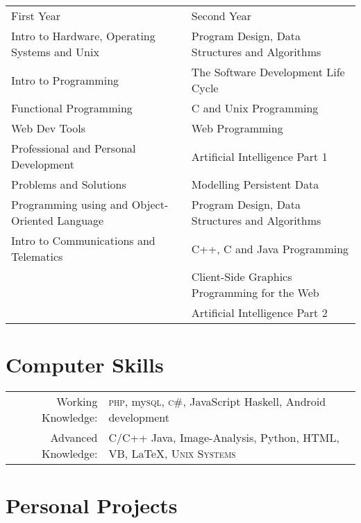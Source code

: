 \documentclass[a4paper,10pt]{article}
\begin{document}
\begin{tabular}{l|l}
  First Year & Second Year 
  \\
  \footnotesize{}Intro to Hardware, Operating Systems and Unix & \footnotesize{}Program Design, Data Structures and Algorithms 
  \\
  \footnotesize{}Intro to Programming & \footnotesize{}The Software Development Life Cycle
  \\
  \footnotesize{}Functional Programming & \footnotesize{}C and Unix Programming
  \\
  \footnotesize{}Web Dev Tools &\footnotesize{}Web Programming 
  \\
  \footnotesize{}Professional and Personal Development & \footnotesize{}Artificial Intelligence Part 1
  \\
  \footnotesize{}Problems and Solutions & \footnotesize{}Modelling Persistent Data
  \\
  \footnotesize{}Programming using and Object-Oriented Language  & \footnotesize{}Program Design, Data Structures and Algorithms
  \\
  \footnotesize{}Intro to Communications and Telematics & \footnotesize{}C++, C and Java Programming
  \\
             & \footnotesize{}Client-Side Graphics Programming for the Web 
  \\
             & \footnotesize{}Artificial Intelligence Part 2 



\end{tabular}

\section{Computer Skills}
\begin{tabular}{rl}
  Working Knowledge:& \textsc{php}, my\textsc{sql}, \textsc{c\#}, JavaScript Haskell, Android  development  \\
  Advanced Knowledge:& C/C++ Java, Image-Analysis, Python, HTML, VB, \LaTeX, \textsc{Unix Systems}
\end{tabular}
\par 

\section{Personal Projects }
\end{document}
